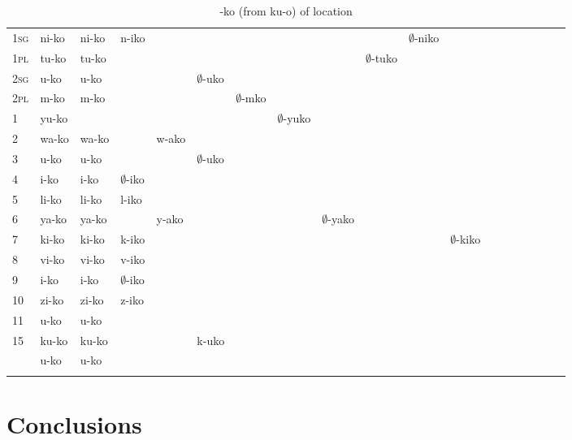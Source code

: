 \documentclass[output=paper,colorlinks,citecolor=brown]{langscibook}
\begin{document}
\begin{table}
\begin{tabular}{lllllllllllllllllll}
\textsc{1sg}     & ni-ko & ni-ko   &n-iko             &                &             &               &        &       &       & {\small $\emptyset$-niko}      \\
\textsc{1pl}     & tu-ko &  tu-ko  &                  &               &               &               &       &       & {\small $\emptyset$-tuko}   \\
\textsc{2sg}     & u-ko  &  u-ko   &                  &               & $\emptyset$-uko    \\
\textsc{2pl}     & m-ko  &  m-ko   &                  &               &               & $\emptyset$-mko          &   &   \\
1          & yu-ko &         &                  &               &               &               &$\emptyset$-yuko         &   \\
2          & wa-ko & wa-ko   &                  & w-ako         &               &  \\
3          & u-ko  & u-ko    &                  &               & $\emptyset$-uko &  &    \\
4          & i-ko  & i-ko    & $\emptyset$-iko  &               &     \\
5          & li-ko & li-ko   &  l-iko        \\
6          & ya-ko  & ya-ko  &                  & y-ako         &               &       &       &$\emptyset$-yako &       \\
7          & ki-ko  & ki-ko  &  k-iko           &               &               &       &       &   &           &       &{\small $\emptyset$-kiko}\\
8          & vi-ko  & vi-ko  & v-iko            &  \\
9          & i-ko   &  i-ko  & $\emptyset$-iko  &    \\
10         & zi-ko  & zi-ko  &  z-iko           &               &               &     \\
11         & u-ko   &  u-ko      \\
15         & ku-ko  & ku-ko  &                  &               & k-uko \\
           & u-ko   & u-ko   &                  &               &        \\\lspbottomrule
 \end{tabular}
\caption{-ko (from ku-o) of location\label{ko}}
\end{table}

\section{Conclusions}
\end{document}
